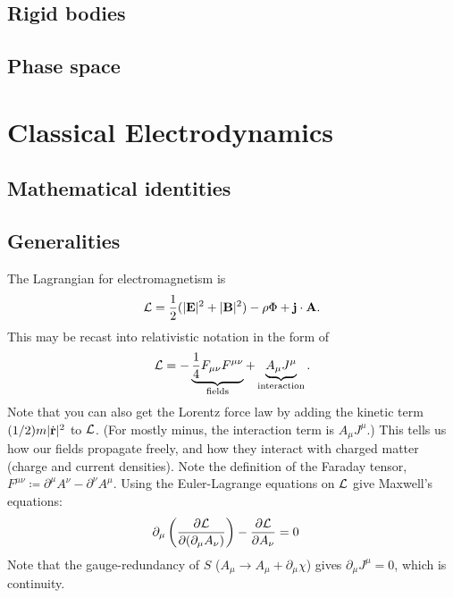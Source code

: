 \documentclass[11pt]{article}
\begin{document}
\subsection{Rigid bodies}



\subsection{Phase space}


\newpage

\section{Classical Electrodynamics}

\subsection{Mathematical identities}


\subsection{Generalities}


The Lagrangian for electromagnetism is
\begin{align*}
    \mathcal{L} = \frac{1}{2} (|\mathbf{E}|^2 + |\mathbf{B}|^2) - \rho \Phi + \mathbf{j} \cdot \mathbf{A}.
\end{align*}
This may be recast into relativistic notation in the form of
\begin{align*}
    \mathcal{L} = - \underbrace{\frac{1}{4} F_{\mu \nu} F^{\mu \nu}}_{\rm fields} + \underbrace{A_{\mu} J^{\mu}}_{\rm interaction}.
\end{align*}
Note that you can also get the Lorentz force law by adding
the kinetic term $(1/2)m|\dot{\mathbf{r}}|^2$ to $\mathcal{L}$.
(For mostly minus, the interaction term is $A_{\mu} J^\mu$.)
This tells us how our fields propagate freely, and how they interact
with charged matter (charge and current densities). Note the definition
of the Faraday tensor, $F^{\mu \nu} \coloneqq \partial^\mu A^\nu - \partial^\nu A^\mu$.
Using the Euler-Lagrange equations on $\mathcal{L}$ give Maxwell's equations:
\begin{align*}
    \partial_\mu \left( \frac{\partial \mathcal{L}}{\partial (\partial_\mu A_\nu)} \right) - \frac{\partial \mathcal{L}}{\partial A_\nu} & = 0
\end{align*}
Note that the gauge-redundancy of $S$ ($A_\mu \to A_\mu + \partial_\mu \chi$)
gives $\partial_\mu J^\mu = 0$, which is continuity.
\end{document}
